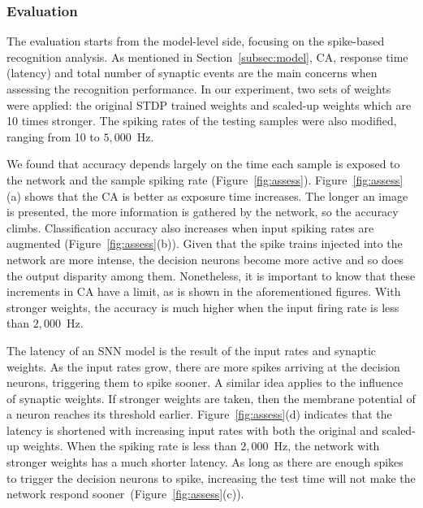\documentclass{frontiersENG} %
\begin{document}
\subsubsection{Evaluation}
The evaluation starts from the model-level side, focusing on the spike-based recognition analysis.
As mentioned in Section~\ref{subsec:model}, CA, response time (latency) and total number of synaptic events are the main concerns when assessing the recognition performance.
In our experiment, two sets of weights were applied: the original STDP trained weights and scaled-up weights which are 10 times stronger.
The spiking rates of the testing samples were also modified, ranging from 10 to $5,000$~Hz.

We found that accuracy depends largely on the time each sample is exposed to the network and the sample spiking rate (Figure~\ref{fig:assess}).
Figure~\ref{fig:assess}(a) shows that the CA is better as exposure time increases. The longer an image is presented, the more information is gathered by the network, so the accuracy climbs.
Classification accuracy also increases when input spiking rates are augmented (Figure~\ref{fig:assess}(b)).
Given that the spike trains injected into the network are more intense, the decision neurons become more active and so does the output disparity among them.
Nonetheless, it is important to know that these increments in CA have a limit, as is shown in the aforementioned figures.
With stronger weights, the accuracy is much higher when the input firing rate is less than $2,000$~Hz.


The latency of an SNN model is the result of the input rates and synaptic weights.
As the input rates grow, there are more spikes arriving at the decision neurons, triggering them to spike sooner.
A similar idea applies to the influence of synaptic weights.
If stronger weights are taken, then the membrane potential of a neuron reaches its threshold earlier.
Figure~\ref{fig:assess}(d) indicates that the latency is shortened with increasing input rates with both the original and scaled-up weights.
When the spiking rate is less than $2,000$~Hz, the network with stronger weights has a much shorter latency.
As long as there are enough spikes to trigger the decision neurons to spike, increasing the test time will not make the network respond sooner~(Figure~\ref{fig:assess}(c)).
\end{document}
